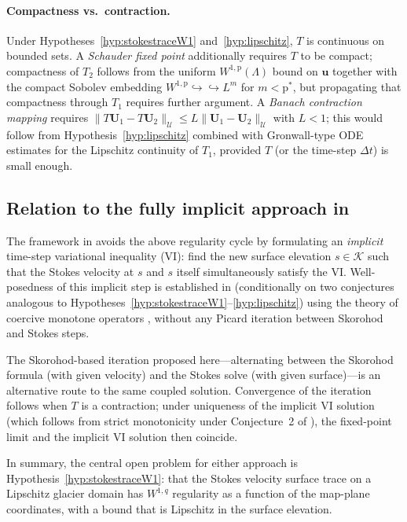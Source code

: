\documentclass[hidelinks,onefignum,onetabnum,final]{siamart220329}  %
\newcommand{\bu}{\mathbf{u}}
\newcommand{\bU}{\mathbf{U}}
\newcommand{\cK}{\mathcal{K}}
\newcommand{\cU}{\mathcal{U}}
\newcommand{\pp}{\mathrm{p}}
\begin{document}
\paragraph{Compactness vs.\ contraction.}
Under Hypotheses~\ref{hyp:stokestraceW1} and~\ref{hyp:lipschitz},
$T$ is continuous on bounded sets.
A \emph{Schauder fixed point} additionally requires $T$ to be compact;
compactness of $T_2$ follows from the uniform $W^{1,\pp}(\Lambda)$
bound on $\bu$ together with the compact Sobolev embedding
$W^{1,\pp}\hookrightarrow\hookrightarrow L^m$ for $m<\pp^*$,
but propagating that compactness through $T_1$ requires further
argument.
A \emph{Banach contraction mapping} requires
$\|T\bU_1-T\bU_2\|_\cU \le L\|\bU_1-\bU_2\|_\cU$ with $L<1$;
this would follow from Hypothesis~\ref{hyp:lipschitz} combined with
Gronwall-type ODE estimates for the Lipschitz continuity of $T_1$,
provided $T$ (or the time-step $\Delta t$) is small enough.

\subsection{Relation to the fully implicit approach in \cite{Bueler2025}}  \label{app:implicit}

The framework in \cite{Bueler2025} avoids the above regularity cycle
by formulating an \emph{implicit} time-step variational inequality (VI):
find the new surface elevation $s\in\cK$ such that the Stokes velocity
at $s$ and $s$ itself simultaneously satisfy the VI.
Well-posedness of this implicit step is established in \cite{Bueler2025}
(conditionally on two conjectures analogous to
Hypotheses~\ref{hyp:stokestraceW1}--\ref{hyp:lipschitz}) using the
theory of coercive monotone operators \cite{KinderlehrerStampacchia1980},
without any Picard iteration between Skorohod and Stokes steps.

The Skorohod-based iteration proposed here---alternating between
the Skorohod formula (with given velocity) and the Stokes solve
(with given surface)---is an alternative route to the same coupled
solution.
Convergence of the iteration follows when $T$ is a contraction; under
uniqueness of the implicit VI solution
(which follows from strict monotonicity under Conjecture~2 of
\cite{Bueler2025}), the fixed-point limit and the implicit VI solution
then coincide.

In summary, the central open problem for either approach is
Hypothesis~\ref{hyp:stokestraceW1}: that the Stokes velocity surface
trace on a Lipschitz glacier domain has $W^{1,q}$ regularity as a
function of the map-plane coordinates, with a bound that is Lipschitz
in the surface elevation.
\end{document}
